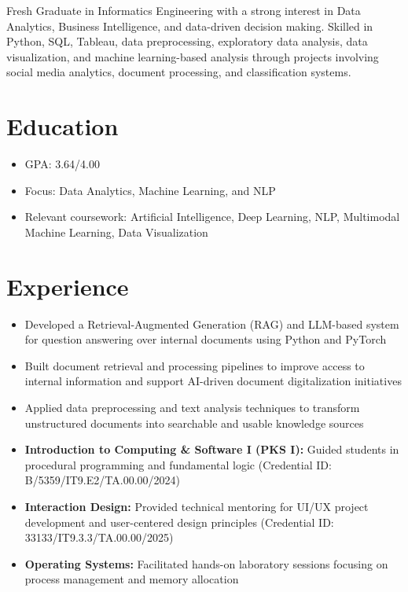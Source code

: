 Fresh Graduate in Informatics Engineering with a strong interest in Data Analytics, Business Intelligence, and data-driven decision making. Skilled in Python, SQL, Tableau, data preprocessing, exploratory data analysis, data visualization, and machine learning-based analysis through projects involving social media analytics, document processing, and classification systems.
\section*{Education}
\begin{itemize}
  \item GPA: 3.64/4.00
  \item Focus: Data Analytics, Machine Learning, and NLP
  \item Relevant coursework: Artificial Intelligence, Deep Learning, NLP, Multimodal Machine Learning, Data Visualization
\end{itemize}

\section*{Experience}
\begin{itemize}
  \item Developed a Retrieval-Augmented Generation (RAG) and LLM-based system for question answering over internal documents using Python and PyTorch
  \item Built document retrieval and processing pipelines to improve access to internal information and support AI-driven document digitalization initiatives
  \item Applied data preprocessing and text analysis techniques to transform unstructured documents into searchable and usable knowledge sources
\end{itemize}

\begin{itemize}
  \item \textbf{Introduction to Computing \& Software I (PKS I):} Guided students in procedural programming and fundamental logic (Credential ID: B/5359/IT9.E2/TA.00.00/2024)
  \item \textbf{Interaction Design:} Provided technical mentoring for UI/UX project development and user-centered design principles (Credential ID: 33133/IT9.3.3/TA.00.00/2025)
  \item \textbf{Operating Systems:} Facilitated hands-on laboratory sessions focusing on process management and memory allocation
\end{itemize}

